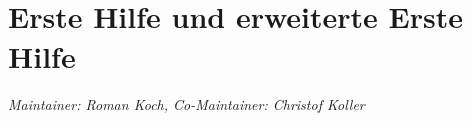 \chapter[EHI // Erste Hilfe und erweiterte Erste Hilfe]{\\Erste
Hilfe und erweiterte Erste Hilfe}
\label{chp:EHI}

\emph{Maintainer: Roman Koch, Co-Maintainer: Christof Koller}












\minitoc


